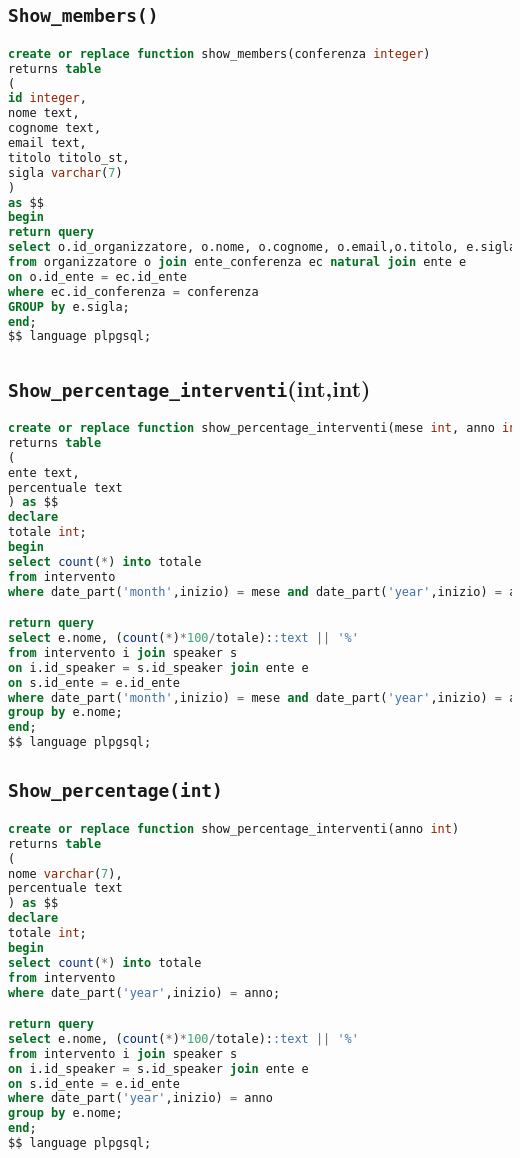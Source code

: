 \subsection{\texttt{Show\_members()}}
\begin{lstlisting}[language=SQL,style=mystyle]
create or replace function show_members(conferenza integer)
returns table 
(
id integer, 
nome text, 
cognome text, 
email text,
titolo titolo_st, 
sigla varchar(7)
) 
as $$
begin
return query
select o.id_organizzatore, o.nome, o.cognome, o.email,o.titolo, e.sigla
from organizzatore o join ente_conferenza ec natural join ente e  
on o.id_ente = ec.id_ente
where ec.id_conferenza = conferenza
GROUP by e.sigla;
end;
$$ language plpgsql;
\end{lstlisting}
\subsection{\texttt{Show\_percentage\_interventi}(int,int)}
\begin{lstlisting}[language=SQL,style=mystyle]
create or replace function show_percentage_interventi(mese int, anno int)
returns table
(
ente text,
percentuale text
) as $$
declare
totale int;
begin
select count(*) into totale
from intervento
where date_part('month',inizio) = mese and date_part('year',inizio) = anno;

return query
select e.nome, (count(*)*100/totale)::text || '%'
from intervento i join speaker s 
on i.id_speaker = s.id_speaker join ente e 
on s.id_ente = e.id_ente
where date_part('month',inizio) = mese and date_part('year',inizio) = anno
group by e.nome;
end;
$$ language plpgsql;
\end{lstlisting}
\subsection{\texttt{Show\_percentage(int)}}
\begin{lstlisting}[language=SQL,style=mystyle]
create or replace function show_percentage_interventi(anno int)
returns table
(
nome varchar(7),
percentuale text
) as $$
declare
totale int;
begin
select count(*) into totale
from intervento
where date_part('year',inizio) = anno;

return query
select e.nome, (count(*)*100/totale)::text || '%'
from intervento i join speaker s 
on i.id_speaker = s.id_speaker join ente e 
on s.id_ente = e.id_ente
where date_part('year',inizio) = anno
group by e.nome;
end;
$$ language plpgsql;
\end{lstlisting}
